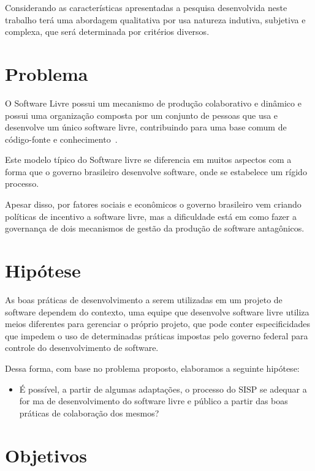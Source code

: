 Considerando as características apresentadas a pesquisa desenvolvida neste trabalho
terá uma abordagem qualitativa por usa natureza indutiva, subjetiva e complexa, que será 
determinada por critérios diversos.  

\section{Problema}

O Software Livre possui um mecanismo de produção colaborativo e dinâmico 
e possui uma organização composta por um conjunto de pessoas que usa e desenvolve 
um único software livre, contribuindo para uma base comum de código-fonte e 
conhecimento~\cite{reis2003caracterizacc}.

Este modelo típico do Software livre se diferencia em muitos aspectos com a forma
que o governo brasileiro desenvolve software, onde se estabelece um rígido processo.

Apesar disso, por fatores sociais e econômicos o governo brasileiro vem
criando políticas de incentivo a software livre, mas a dificuldade está em como
fazer a governança de dois mecanismos de gestão da produção de software antagônicos. 

\section{Hipótese}

As boas práticas de desenvolvimento a serem utilizadas em um projeto de software 
dependem do contexto, uma equipe que desenvolve software livre utiliza
meios diferentes para gerenciar o próprio projeto, que pode conter especificidades 
que impedem o uso de determinadas práticas impostas pelo governo federal para controle
do desenvolvimento de software. 

Dessa forma, com base no problema proposto, elaboramos a seguinte hipótese:

\begin{itemize}
\item É possível, a partir de algumas adaptações, o processo do SISP se adequar
a for ma de desenvolvimento do software livre e público a partir das boas práticas 
de colaboração dos mesmos?
\end{itemize}


\section{Objetivos}

